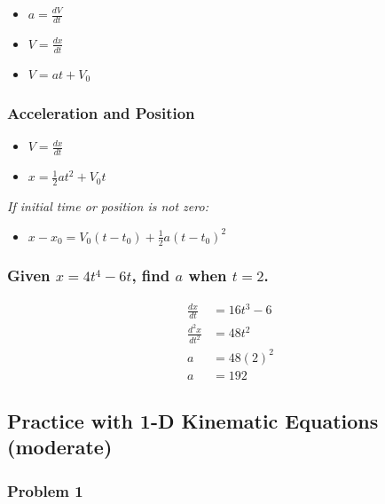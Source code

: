 \documentclass[
  letterpaper,
  DIV=11,
  numbers=noendperiod]{scrartcl}
\providecommand{\tightlist}{%
  \setlength{\itemsep}{0pt}\setlength{\parskip}{0pt}}\usepackage{longtable,booktabs,array}
\begin{document}
\begin{itemize}
\tightlist
\item
  \(a = \frac{dV}{dt}\)
\item
  \(V = \frac{dx}{dt}\)
\item
  \(V = at + V_0\)
\end{itemize}

\hypertarget{acceleration-and-position}{%
\subsubsection{Acceleration and
Position}\label{acceleration-and-position}}

\begin{itemize}
\tightlist
\item
  \(V = \frac{dx}{dt}\)
\item
  \(x = \frac{1}{2}at^2 + V_0t\)
\end{itemize}

\emph{If initial time or position is not zero:}

\begin{itemize}
\tightlist
\item
  \(x-x_0 = V_0(t-t_0) + \frac{1}{2}a(t-t_0)^2\)
\end{itemize}

\hypertarget{given-x4t4---6t-find-a-when-t2.}{%
\subsubsection{\texorpdfstring{Given \(x=4t^4 - 6t\), find \(a\) when
\(t=2\).}{Given x=4t\^{}4 - 6t, find a when t=2.}}\label{given-x4t4---6t-find-a-when-t2.}}

\begin{align*}
\frac{dx}{dt} &= 16t^3 - 6 \\
\frac{d^2x}{dt^2} &= 48t^2 \\
a &= 48(2)^2 \\
a &= 192
\end{align*}

\newpage{}

\hypertarget{practice-with-1-d-kinematic-equations-moderate}{%
\subsection{Practice with 1-D Kinematic Equations
(moderate)}\label{practice-with-1-d-kinematic-equations-moderate}}

\hypertarget{problem-1-1}{%
\subsubsection{Problem 1}\label{problem-1-1}}
\end{document}
